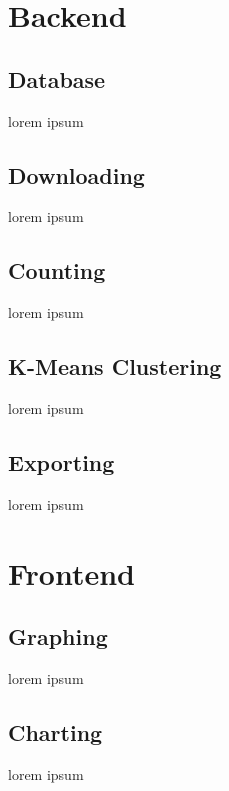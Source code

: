 \documentclass{article}
\begin{document}
\section{Backend}

\subsection{Database}
lorem ipsum

\subsection{Downloading}
lorem ipsum

\subsection{Counting}
lorem ipsum

\subsection{K-Means Clustering}
lorem ipsum

\subsection{Exporting}
lorem ipsum



\section{Frontend}

\subsection{Graphing}
lorem ipsum

\subsection{Charting}
lorem ipsum


\end{document}

